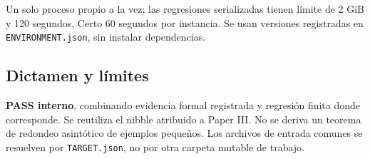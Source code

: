 Un solo proceso propio a la vez; las regresiones serializadas tienen
límite de 2 GiB y 120 segundos, Certo 60 segundos por instancia. Se usan
versiones registradas en \texttt{ENVIRONMENT.json}, sin instalar
dependencias.

\subsection{Dictamen y límites}\label{dictamen-y-luxedmites}

\textbf{PASS interno}, combinando evidencia formal registrada y
regresión finita donde corresponde. Se reutiliza el nibble atribuido a
Paper III. No se deriva un teorema de redondeo asintótico de ejemplos
pequeños. Los archivos de entrada comunes se resuelven por
\texttt{TARGET.json}, no por otra carpeta mutable de trabajo.
